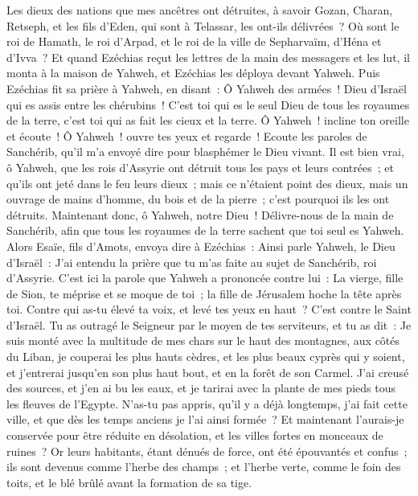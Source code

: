 \begin{multicols}{2}
Les dieux des nations que mes ancêtres ont détruites, à savoir Gozan, Charan, Retseph, et les fils d'Eden, qui sont à Telassar, les ont-ils délivrées~?
Où sont le roi de Hamath, le roi d'Arpad, et le roi de la ville de Sepharvaïm, d'Héna et d'Ivva~?
Et quand Ezéchias reçut les lettres de la main des messagers et les lut, il monta à la maison de Yahweh, et Ezéchias les déploya devant Yahweh.
Puis Ezéchias fit sa prière à Yahweh, en disant~:
Ô Yahweh des armées~! Dieu d'Israël qui es assis entre les chérubins~! C'est toi qui es le seul Dieu de tous les royaumes de la terre, c'est toi qui as fait les cieux et la terre.
Ô Yahweh~! incline ton oreille et écoute~! Ô Yahweh~! ouvre tes yeux et regarde~! Ecoute les paroles de Sanchérib, qu'il m'a envoyé dire pour blasphémer le Dieu vivant.
Il est bien vrai, ô Yahweh, que les rois d'Assyrie ont détruit tous les pays et leurs contrées~;
et qu'ils ont jeté dans le feu leurs dieux~; mais ce n'étaient point des dieux, mais un ouvrage de mains d'homme, du bois et de la pierre~; c'est pourquoi ils les ont détruits.
Maintenant donc, ô Yahweh, notre Dieu~! Délivre-nous de la main de Sanchérib, afin que tous les royaumes de la terre sachent que toi seul es Yahweh.
Alors Esaïe, fils d'Amots, envoya dire à Ezéchias~: Ainsi parle Yahweh, le Dieu d'Israël~: J'ai entendu la prière que tu m'as faite au sujet de Sanchérib, roi d'Assyrie.
C'est ici la parole que Yahweh a prononcée contre lui~: La vierge, fille de Sion, te méprise et se moque de toi~; la fille de Jérusalem hoche la tête après toi.
Contre qui as-tu élevé ta voix, et levé tes yeux en haut~? C'est contre le Saint d'Israël.
Tu as outragé le Seigneur par le moyen de tes serviteurs, et tu as dit~: Je suis monté avec la multitude de mes chars sur le haut des montagnes, aux côtés du Liban, je couperai les plus hauts cèdres, et les plus beaux cyprès qui y soient, et j'entrerai jusqu'en son plus haut bout, et en la forêt de son Carmel.
J'ai creusé des sources, et j'en ai bu les eaux, et je tarirai avec la plante de mes pieds tous les fleuves de l'Egypte.
N'as-tu pas appris, qu'il y a déjà longtemps, j'ai fait cette ville, et que dès les temps anciens je l'ai ainsi formée~? Et maintenant l'aurais-je conservée pour être réduite en désolation, et les villes fortes en monceaux de ruines~?
Or leurs habitants, étant dénués de force, ont été épouvantés et confus~; ils sont devenus comme l'herbe des champs~; et l'herbe verte, comme le foin des toits, et le blé brûlé avant la formation de sa tige.

\end{multicols}
